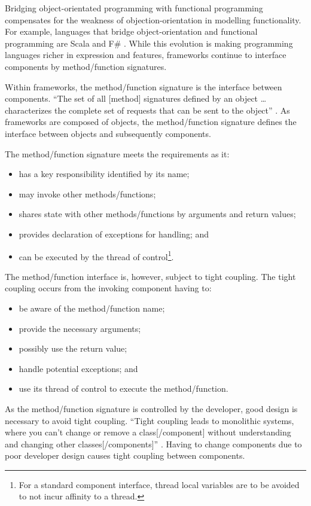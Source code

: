 \documentclass[prodmode]{style/acmlarge}
\begin{document}
Bridging object-orientated programming with functional programming
\cite{bridging-function-oo} compensates for the weakness of
objection-orientation in modelling functionality.  For example, languages that
bridge object-orientation and functional programming are Scala \cite{scala} and
F\# \cite{f-sharp}.  While this evolution is making programming languages richer
in expression and features, frameworks continue to interface components by
method/function signatures.

Within frameworks, the method/function signature is the interface between
components.  ``The set of all [method] signatures defined by an object \ldots
characterizes the complete set of requests that can be sent to the object''
\cite[p. 13]{gof}.  As frameworks are composed of objects, the method/function
signature defines the interface between objects and subsequently components.

The method/function signature meets the requirements as it:
\begin{itemize}
  \item has a key responsibility identified by its name;
  \item may invoke other methods/functions;
  \item shares state with other methods/functions by arguments and return values;
  \item provides declaration of exceptions for handling; and
  \item can be executed by the thread of control\footnote{For a standard component interface, thread local variables are to be avoided to not incur affinity to a thread.}.
\end{itemize}

The method/function interface is, however, subject to tight coupling.  The tight
coupling occurs from the invoking component having to:
\begin{itemize}
  \item be aware of the method/function name;
  \item provide the necessary arguments;
  \item possibly use the return value;
  \item handle potential exceptions; and
  \item use its thread of control to execute the method/function.
\end{itemize}

As the method/function signature is controlled by the developer, good design is
necessary to avoid tight coupling.  ``Tight coupling leads to monolithic
systems, where you can't change or remove a class[/component] without
understanding and changing other classes[/components]'' \cite[p. 24-25]{gof}.
Having to change components due to poor developer design causes tight coupling
between components.
\end{document}
